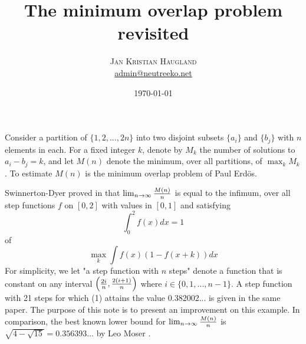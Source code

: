 \documentclass[twoside,twocolumn]{article}
\title{The minimum overlap problem revisited} %
\author{%
\textsc{Jan Kristian Haugland}\\
\normalsize \href{mailto:admin@neutreeko.net}{admin@neutreeko.net} %
}
\date{\today} %
\begin{document}
\maketitle


Consider a partition of $\lbrace 1, 2, ..., 2n\rbrace $ into two disjoint subsets $\lbrace a_i \rbrace $ and $\lbrace b_j \rbrace $ with $n$ elements in each. For a fixed integer $k$, denote by $M_k$ the number of solutions to $a_i - b_j = k$, and let $M(n)$ denote the minimum, over all partitions, of $\max_k M_k$. To estimate $M(n)$ is the minimum overlap problem of Paul Erd\"{o}s.

Swinnerton-Dyer proved in \cite{Haugland:1996} that $\lim_{n\to \infty} {M(n)\over n}$ is equal to the infimum, over all step functions $f$ on $\left[ 0, 2\right]$ with values in $\left[ 0, 1\right]$ and satisfying $$\int_0^2 f(x)dx = 1$$ of \begin{equation} \label{eq:1} \max_k \int f(x)(1-f(x+k))dx \end{equation}
For simplicity, we let "a step function with $n$ steps" denote a function that is constant on any interval $\left( {2i\over n}, {2(i+1)\over n}\right)$ where $i \in \lbrace 0, 1, ..., n - 1 \rbrace$. A step function with 21 steps for which (1) attains the value 0.382002... is given in the same paper. The purpose of this note is to present an improvement on this example. In comparison, the best known lower bound for $\lim_{n\to \infty} {M(n)\over n}$ is $\sqrt{4-\sqrt{15}}=0.356393...$ by Leo Moser \cite{Moser:1959}.
\end{document}
